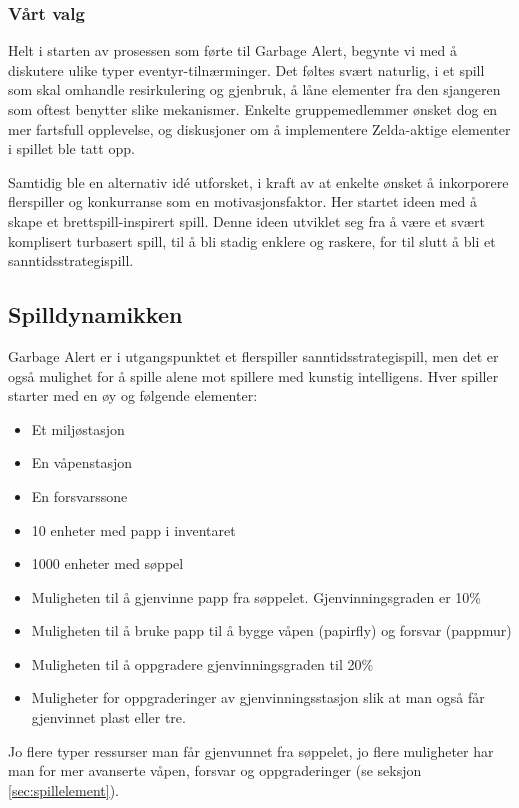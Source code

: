 \subsubsection{Vårt valg}
Helt i starten av prosessen som førte til Garbage Alert, begynte vi med å diskutere ulike typer eventyr-tilnærminger. Det føltes svært naturlig, i et spill som skal omhandle resirkulering og gjenbruk, å låne elementer fra den sjangeren som oftest benytter slike mekanismer. Enkelte gruppemedlemmer ønsket dog en mer fartsfull opplevelse, og diskusjoner om å implementere Zelda-aktige elementer i spillet ble tatt opp.

Samtidig ble en alternativ idé utforsket, i kraft av at enkelte ønsket å inkorporere flerspiller og konkurranse som en motivasjonsfaktor. Her startet ideen med å skape et brettspill-inspirert spill. Denne ideen utviklet seg fra å være et svært komplisert turbasert spill, til å bli stadig enklere og raskere, for til slutt å bli et sanntidsstrategispill.



\subsection{Spilldynamikken}
Garbage Alert er i utgangspunktet et flerspiller sanntidsstrategispill,
men det er også mulighet for å spille alene mot spillere med kunstig
intelligens. Hver spiller starter med en øy og følgende elementer:
\begin{itemize}
	\item Et miljøstasjon
	\item En våpenstasjon
	\item En forsvarssone
	\item 10 enheter med papp i inventaret
	\item 1000 enheter med søppel
	\item Muligheten til å gjenvinne papp fra søppelet. Gjenvinningsgraden er 10\%
	\item Muligheten til å bruke papp til å bygge våpen (papirfly) og forsvar (pappmur)
	\item Muligheten til å oppgradere gjenvinningsgraden til 20\%
	\item Muligheter for oppgraderinger av gjenvinningsstasjon slik at man også får gjenvinnet plast eller tre.
\end{itemize}

Jo flere typer ressurser man får gjenvunnet fra søppelet, jo flere muligheter har man for mer avanserte våpen, forsvar og oppgraderinger (se seksjon \ref{sec:spillelement}).

